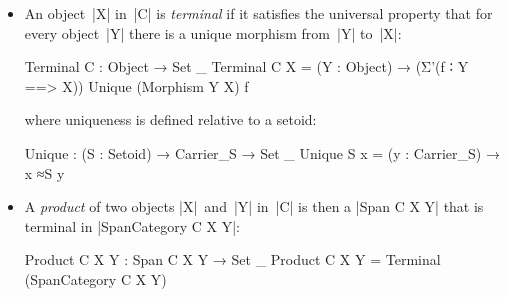 \begin{itemize}[leftmargin=*]
\item An object~|X| in~|C| is \emph{terminal} if it satisfies the universal property that for every object~|Y| there is a unique morphism from~|Y| to~|X|:
\begin{code}
Terminal C : Object → Set _
Terminal C X =
  (Y : Object) → (Σ'(f ∶ Y ==> X)) Unique (Morphism Y X) f
\end{code}
where uniqueness is defined relative to a setoid:
\begin{code}
Unique : (S : Setoid) → Carrier_S → Set _
Unique S x = (y : Carrier_S) → x ≈S y
\end{code}

\item A \emph{product} of two objects |X|~and~|Y| in~|C| is then a |Span C X Y| that is terminal in |SpanCategory C X Y|:
\begin{code}
Product C X Y : Span C X Y → Set _
Product C X Y = Terminal (SpanCategory C X Y)
\end{code}


\end{itemize}
